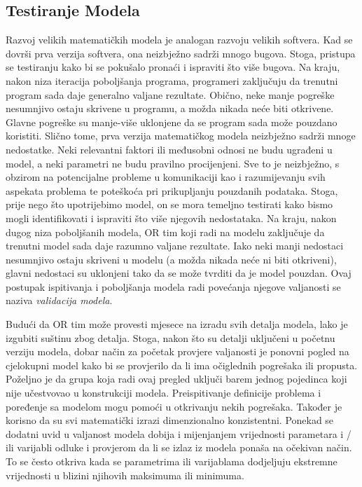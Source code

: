 \documentclass[a4paper, utf8, 11pt, colorlinks]{article}
\begin{document}
\subsection{Testiranje Modela}
Razvoj velikih matematičkih modela je analogan razvoju velikih softvera. Kad se dovrši prva verzija softvera, ona neizbježno sadrži mnogo bugova. Stoga, pristupa se testiranju kako bi se pokušalo pronaći i
ispraviti što više bugova. Na kraju, nakon niza iteracija poboljšanja programa, programeri zaključuju da trenutni program sada
daje generalno valjane rezultate. Obično, neke manje pogreške nesumnjivo ostaju skrivene u programu, a možda nikada neće biti otkrivene. Glavne pogreške su manje-više uklonjene da se program sada može pouzdano koristiti.  Slično tome, prva verzija matematičkog modela neizbježno sadrži mnoge
nedostatke. Neki relevantni faktori ili međusobni odnosi ne budu   ugrađeni
u model, a neki parametri ne budu pravilno procijenjeni. Sve to
je neizbježno, s obzirom na potencijalne probleme u komunikaciji kao i razumijevanju svih aspekata problema te poteškoća pri prikupljanju pouzdanih podataka. Stoga, prije nego što upotrijebimo model, on se mora  temeljno testirati kako bismo mogli  identifikovati 
i ispraviti što više njegovih nedostataka. Na kraju, nakon dugog niza poboljšanih
modela, OR tim koji radi na modelu zaključuje da trenutni model sada daje razumno valjane rezultate.  Iako neki manji nedostaci nesumnjivo ostaju skriveni u modelu (a možda nikada neće ni biti otkriveni), glavni nedostaci su uklonjeni tako da se može tvrditi da je model pouzdan. Ovaj postupak ispitivanja i poboljšanja modela radi povećanja njegove valjanosti se naziva \emph{validacija modela}. 

Budući da OR tim može provesti mjesece na izradu svih detalja modela, lako je izgubiti suštinu zbog detalja. Stoga, nakon što su detalji uključeni u 
početnu verziju modela, dobar način za početak provjere valjanosti je ponovni pogled na cjelokupni model kako bi se provjerilo da li ima  očiglednih pogrešaka ili propusta. Poželjno je da grupa koja radi ovaj pregled uključi barem jednog pojedinca koji nije učestvovao u konstrukciji modela. Preispitivanje definicije
problema i poređenje sa modelom mogu pomoći u otkrivanju nekih pogrešaka. Također je korisno da su svi matematički izrazi dimenzionalno konzistentni.  Ponekad se  dodatni uvid u valjanost modela dobija i 
mijenjanjem vrijednosti parametara i / ili varijabli odluke i provjerom da li se  izlaz iz modela ponaša na očekivan način. To se često otkriva kada se parametrima ili varijablama dodjeljuju ekstremne vrijednosti u blizini njihovih maksimuma ili minimuma. 
 
\end{document}
